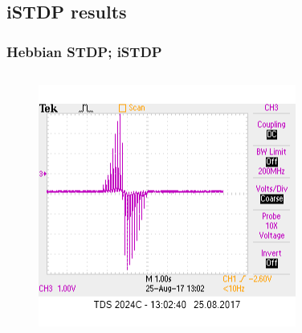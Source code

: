 \documentclass[12pt, aspectratio=169]{beamer}
\begin{document}

\subsection{iSTDP results}

\begin{frame}
\frametitle{Hebbian STDP; iSTDP}
\begin{columns}[c] %

\begin{figure}
\includegraphics[width=1\linewidth]{hebb_output_single}
\end{figure}
\begin{figure}

\end{figure}
\end{columns}
\end{frame}
\end{document}
